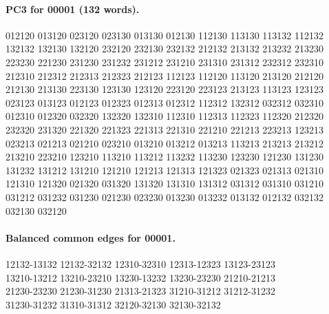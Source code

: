 \documentclass[11pt]{article}
\theoremstyle{remark}
\numberwithin{equation}{section}
\numberwithin{table}{section}
\begin{document}
\paragraph{PC3 for 00001 (132 words).}
\begingroup\footnotesize\ttfamily\begin{flushleft}
012120 013120 023120 023130 013130 012130 112130 113130 113132 112132\\
132132 132130 132120 232120 232130 232132 212132 213132 213232 213230\\
223230 221230 231230 231232 231212 231210 231310 231312 232312 232310\\
212310 212312 212313 212323 212123 112123 112120 113120 213120 212120\\
212130 213130 223130 123130 123120 223120 223123 213123 113123 123123\\
023123 013123 012123 012323 012313 012312 112312 132312 032312 032310\\
012310 012320 032320 132320 132310 112310 112313 112323 112320 212320\\
232320 231320 221320 221323 221313 221310 221210 221213 223213 123213\\
023213 021213 021210 023210 013210 013212 013213 113213 213213 213212\\
213210 223210 123210 113210 113212 113232 113230 123230 121230 131230\\
131232 131212 131210 121210 121213 121313 121323 021323 021313 021310\\
121310 121320 021320 031320 131320 131310 131312 031312 031310 031210\\
031212 031232 031230 021230 023230 013230 013232 013132 012132 032132\\
032130 032120\\
\end{flushleft}\endgroup
\paragraph{Balanced common edges for 00001.}
\begingroup\footnotesize\ttfamily\begin{flushleft}
12132-13132 12132-32132 12310-32310 12313-12323 13123-23123\\
13210-13212 13210-23210 13230-13232 13230-23230 21210-21213\\
21230-23230 21230-31230 21313-21323 31210-31212 31212-31232\\
31230-31232 31310-31312 32120-32130 32130-32132\\
\end{flushleft}\endgroup
\end{document}
